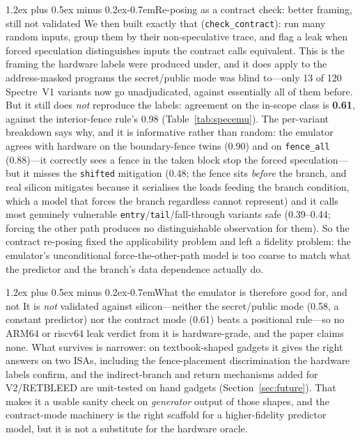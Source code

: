 \documentclass[conference]{IEEEtran}
\makeatletter
\renewcommand\paragraph{\@startsection{paragraph}{4}{\z@}%
  {1.2ex plus 0.5ex minus 0.2ex}{-0.7em}{\normalfont\normalsize\bfseries}}
\makeatother
\begin{document}
\paragraph{Re-posing as a contract check: better framing, still not
validated} We then built exactly that (\texttt{check\_contract}): run many
random inputs, group them by their non-speculative trace, and flag a leak when
forced speculation distinguishes inputs the contract calls equivalent. This is
the framing the hardware labels were produced under, and it does apply to the
address-masked programs the secret/public mode was blind to---only 13 of 120
Spectre~V1 variants now go unadjudicated, against essentially all of them
before. But it still does \emph{not} reproduce the labels: agreement on the
in-scope class is \textbf{0.61}, against the interior-fence rule's 0.98
(Table~\ref{tab:specemu}). The per-variant breakdown says why, and it is
informative rather than random: the emulator agrees with hardware on the
boundary-fence twins (0.90) and on \texttt{fence\_all} (0.88)---it correctly
sees a fence in the taken block stop the forced speculation---but it misses the
\texttt{shifted} mitigation (0.48; the fence sits \emph{before} the branch,
and real silicon mitigates because it serialises the loads feeding the branch
condition, which a model that forces the branch regardless cannot represent)
and it calls most genuinely vulnerable \texttt{entry}/\texttt{tail}/fall-through
variants safe (0.39--0.44; forcing the other path produces no distinguishable
observation for them). So the contract re-posing fixed the applicability
problem and left a fidelity problem: the emulator's unconditional
force-the-other-path model is too coarse to match what the predictor and the
branch's data dependence actually do.

\paragraph{What the emulator is therefore good for, and not}
It is \emph{not} validated against silicon---neither the secret/public mode
(0.58, a constant predictor) nor the contract mode (0.61) beats a positional
rule---so no ARM64 or riscv64 leak verdict from it is hardware-grade, and the
paper claims none. What survives is narrower: on textbook-shaped gadgets it
gives the right answers on two ISAs, including the fence-placement
discrimination the hardware labels confirm, and the indirect-branch and return
mechanisms added for V2/RETBLEED are unit-tested on hand gadgets
(Section~\ref{sec:future}). That makes it a usable sanity check on
\emph{generator} output of those shapes, and the contract-mode machinery is the
right scaffold for a higher-fidelity predictor model, but it is not a
substitute for the hardware oracle.
\end{document}
